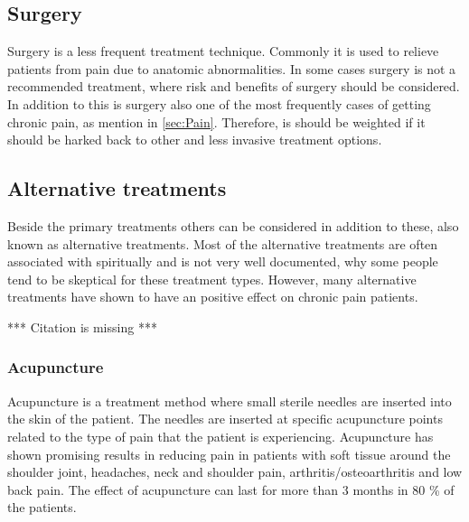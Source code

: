 \subsection{Surgery}
Surgery is a less frequent treatment technique. Commonly it is used to relieve patients from pain due to anatomic abnormalities. \cite{marcus2009,pope2017} In some cases surgery is not a recommended treatment, where risk and benefits of surgery should be considered. In addition to this is surgery also one of the most frequently cases of getting chronic pain, as mention in \autoref{sec:Pain}. Therefore, is should be weighted if it should be harked back to other and less invasive treatment options. \cite{pope2017}

\subsection{Alternative treatments}
Beside the primary treatments others can be considered in  addition to these, also known as alternative treatments. Most of the alternative treatments are often associated with spiritually and is not very well documented, why some people tend to be skeptical for these treatment types. However, many alternative treatments have shown to have an positive effect on chronic pain patients.

*** Citation is missing ***

\subsubsection{Acupuncture}
Acupuncture is a treatment method where small sterile needles are inserted into the skin of the patient. The needles are inserted at specific acupuncture points related to the type of pain that the patient is experiencing. \cite{Dhanani2011} Acupuncture has shown promising results in reducing pain in patients with soft tissue around the shoulder joint, headaches, neck and shoulder pain, arthritis/osteoarthritis and low back pain. The effect of acupuncture can last for more than 3 months in 80 \% of the patients. \cite{Junnilla1983} 


